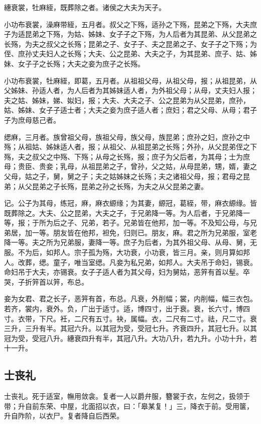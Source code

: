 \documentclass[]{article}
\begin{document}
繐衰裳，牡麻絰，既葬除之者。诸侯之大夫为天子。

小功布衰裳，澡麻带絰，五月者。叔父之下殇，适孙之下殇，昆弟之下殇，大夫庶子为适昆弟之下殇，为姑、姊妹、女子子之下殇，为人后者为其昆弟、从父昆弟之长殇，为夫之叔父之长殇；昆弟之子、女子子、夫之昆弟之子、女子子之下殇；为侄、庶孙丈夫妇人之长殇；大夫、公之昆弟、大夫之子，为其昆弟、庶子、姑、姊妹、女子子之长殇；大夫之妾为庶子之长殇。

小功布衰裳，牡麻絰，即葛，五月者。从祖祖父母，从祖父母，报；从祖昆弟，从父姊妹、孙适人者，为人后者为其姊妹适人者，为外祖父母；从母，丈夫妇人报；夫之姑、姊妹，娣、姒妇，报；大夫、大夫之子、公之昆弟为从父昆弟，庶孙，姑、姊妹、女子子适士者；大夫之妾为庶子适人者；庶妇；君之父母、从母；君子子为庶母慈己者。

缌麻，三月者。族曾祖父母，族祖父母，族父母，族昆弟；庶孙之妇，庶孙之中殇；从祖姑、姊妹适人者，报；从祖父、从祖昆弟之长殇；外孙，从父昆弟侄之下殇，夫之叔父之中殇、下殇；从母之长殇，报；庶子为父后者，为其母；士为庶母；贵臣、贵妾；乳母，从祖昆弟之子，曾孙，父之姑，从母昆弟，甥，婿，妻之父母，姑之子，舅，舅之子；夫之姑姊妹之长殇；夫之诸祖父母，报；君母之昆弟；从父昆弟之子长殇，昆弟之孙之长殇，为夫之从父昆弟之妻。

记。公子为其母，练冠，麻，麻衣縓缘；为其妻，縓冠，葛絰，带，麻衣縓缘。皆既葬除之。大夫、公之昆弟，大夫之子，于兄弟降一等。为人后者，于兄弟降一等，报；于所为后之子、兄弟，若子。兄弟皆在他邦，加一等。不及知公母，与兄弟居，加一等。朋友皆在他邦，袒免，归则已。朋友，麻。君之所为兄弟服，室老降一等。夫之所为兄弟服，妻降一等。庶子为后者，为其外祖父母、从母、舅，无服。不为后，如邦人。宗子孤为殇，大功衰，小功衰，皆三月。亲，则月算如邦人。改葬，缌。童子，唯当室缌。凡妾为私兄弟，如邦人。大夫吊于命妇，锡衰。命妇吊于大夫，亦锡衰。女子子适人者为其父母，妇为舅姑，恶笄有首以髽。卒哭，子折笄首以笄，布总。

妾为女君、君之长子，恶笄有首，布总。凡衰，外削幅；裳，内削幅，幅三衣包。若齐，裳内，衰外。负，广出于适寸。适，博四寸，出于衰。衰，长六寸，博四寸。衣带，下尺。衽，二尺有五寸。袂，属幅。衣，二尺有二寸。祛，尺二寸。衰三升，三升有半。其冠六升。以其冠为受，受冠七升。齐衰四升，其冠七升。以其冠为受，受冠八升。繐衰四升有半，其冠八升。大功八升，若九升。小功十升，若十一升。

\hypertarget{header-n56}{%
\subsection{士丧礼}\label{header-n56}}

士丧礼。死于适室，幠用敛衾。复者一人以爵弁服，簪裳于衣，左何之，扱领于带；升自前东荣、中屋，北面招以衣，曰：「皋某复！」三，降衣于前。受用箧，升自阼阶，以衣尸。复者降自后西荣。
\end{document}
